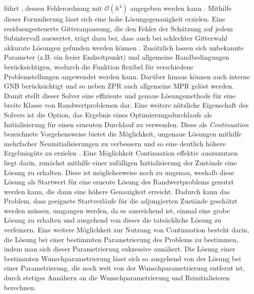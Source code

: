 führt \cite{Cash.1980}, dessen Fehlerordnung mit $\mathcal{O}(h^4)$ angegeben werden kann \cite{Kierzenka.2001}. Mithilfe dieser Formulierung lässt sich eine hohe Lösungsgenauigkeit erzielen. Eine residuengesteuerte Gitteranpassung, die den Fehler der Schätzung auf jedem Subintervall auswertet, trägt dazu bei, dass auch bei schlechter Gitterwahl akkurate Lösungen gefunden werden können \cite{Kierzenka.2001}. Zusätzlich lassen sich unbekannte Parameter (z.B. ein freier Endzeitpunkt) und allgemeine Randbedingungen berücksichtigen, wodurch die Funktion flexibel für verschiedene Problemstellungen angewendet werden kann. Darüber hinaus können auch interne \gls{GNB} berücksichtigt und so neben \gls{ZPR} auch allgemeine \gls{MPR} gelöst werden. Damit stellt dieser Solver eine effiziente und genaue Lösungsmethode für eine breite Klasse von Randwertproblemen dar. Eine weitere nützliche Eigenschaft des Solvers ist die Option, das Ergebnis eines Optimierungsdurchlaufs als Initialisierung für einen erneuten Durchlauf zu verwenden. Diese als \textit{Continuation} bezeichnete Vorgehensweise bietet die Möglichkeit, ungenaue Lösungen mithilfe mehrfacher Neuinitialisierungen zu verbessern und so eine deutlich höhere Ergebnisgüte zu erzielen \cite{Kierzenka.2001}. Eine Möglichkeit Continuation effektiv auszunutzen liegt darin, zunächst mithilfe einer zufälligen Initialisierung der Zustände eine Lösung zu erhalten. Diese ist möglicherweise noch zu ungenau, weshalb diese Lösung als Startwert für eine erneute Lösung des Randwertproblems genutzt werden kann, die dann eine höhere Genauigkeit erreicht. Dadurch kann das Problem, dass geeignete Startverläufe für die adjungierten Zustände geschätzt werden müssen, umgangen werden, da es ausreichend ist, einmal eine grobe Lösung zu erhalten und ausgehend von dieser die tatsächliche Lösung zu verfeinern. Eine weitere Möglichkeit zur Nutzung von Continuation besteht darin, die Lösung bei einer bestimmten Parametrierung des Problems zu bestimmen, indem man sich dieser Parametrierung sukzessive annähert. Die Lösung einer bestimmten Wunschparametrierung lässt sich so ausgehend von der Lösung bei einer Parametrierung, die noch weit von der Wunschparametrierung entfernt ist, durch stetiges Annähern an die Wunschparametrierung und Reinitialisieren berechnen.

